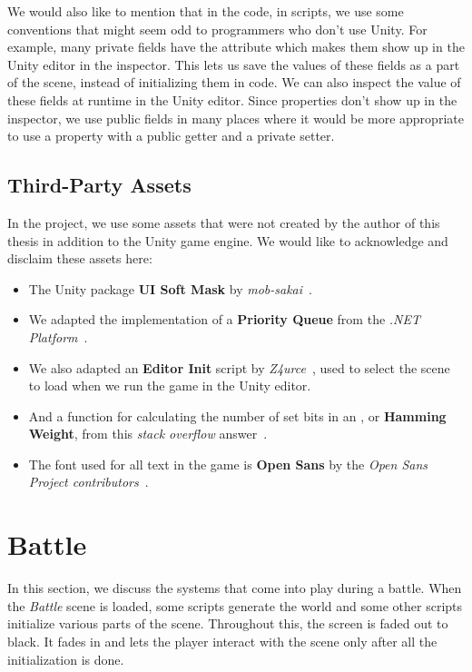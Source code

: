 We would also like to mention that in the code, in  scripts, we use some conventions that might seem odd to programmers who don't use Unity.
For example, many private fields have the attribute \mono{[SerializeField]} which makes them show up in the Unity editor in the inspector.
This lets us save the values of these fields as a part of the scene, instead of initializing them in code.
We can also inspect the value of these fields at runtime in the Unity editor.
Since properties don't show up in the inspector, we use public fields in many places where it would be more appropriate to use a property with a public getter and a private setter.

\subsection{Third-Party Assets}
In the project, we use some assets that were not created by the author of this thesis in addition to the Unity game engine.
We would like to acknowledge and disclaim these assets here:
\begin{itemize}
    \item The Unity package \textbf{UI Soft Mask} by \emph{mob-sakai}~\cite{SoftMask}.
    \item We adapted the implementation of a \textbf{Priority Queue} from the \emph{.NET Platform}~\cite{PriorityQueue}.
    \item We also adapted an \textbf{Editor Init} script by \emph{Z4urce}~\cite{EditorInit}, used to select the scene to load when we run the game in the Unity editor.
    \item And a function for calculating the number of set bits in an , or \textbf{Hamming Weight}, from this \emph{stack overflow} answer~\cite{PopCount}.
    \item The font used for all text in the game is \textbf{Open Sans} by the \emph{Open Sans Project contributors}~\cite{OpenSans}.
\end{itemize}

\section{Battle}\label{sec:docs-battle}

In this section, we discuss the systems that come into play during a battle.
When the \emph{Battle} scene is loaded, some scripts generate the world and some other scripts initialize various parts of the scene.
Throughout this, the screen is faded out to black.
It fades in and lets the player interact with the scene only after all the initialization is done.

